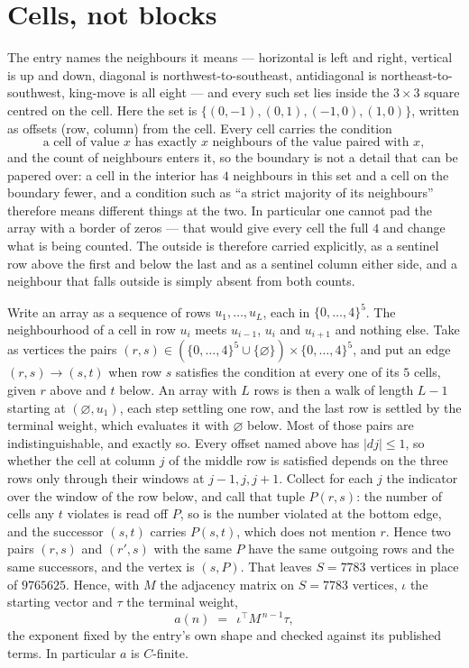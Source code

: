 \documentclass[11pt,a4paper]{article}
\theoremstyle{plain}
\theoremstyle{definition}
\begin{document}
\section{Cells, not blocks}

The entry names the neighbours it means --- horizontal is left and right, vertical is up and
down, diagonal is northwest-to-southeast, antidiagonal is northeast-to-southwest, king-move is
all eight --- and every such set lies inside the $3\times3$ square centred on the cell. Here
the set is $\{(0,-1), (0,1), (-1,0), (1,0)\}$, written as offsets (row, column) from the cell. Every cell carries
the condition
\[
\text{a cell of value }x\text{ has exactly }x\text{ neighbours of the value paired with }x,
\]
and the count of neighbours enters it, so the boundary is not a detail that can be papered
over: a cell in the interior has $4$ neighbours in this set and a cell on the boundary
fewer, and a condition such as ``a strict majority of its neighbours'' therefore means
different things at the two. In particular one cannot pad the array with a border of zeros ---
that would give every cell the full $4$ and change what is being counted. The outside is
therefore carried
explicitly, as a sentinel row above the first and below the last and as a sentinel column
either side, and a neighbour that falls outside is simply absent from both counts.

Write an array as a sequence of rows $u_1,\dots,u_L$, each in
$\{0,\dots,4\}^{5}$. The neighbourhood of a cell in row $u_i$ meets $u_{i-1}$,
$u_i$ and $u_{i+1}$ and nothing else. Take as vertices the pairs
$(r,s)\in(\{0,\dots,4\}^{5}\cup\{\varnothing\})\times\{0,\dots,4\}^{5}$,
and put an edge $(r,s)\to(s,t)$ when row $s$ satisfies the condition at every one of its
$5$ cells, given $r$ above and $t$ below. An array with $L$ rows is then a walk of length
$L-1$ starting at $(\varnothing,u_1)$, each step settling one row, and the last row is
settled by the terminal weight, which evaluates it with $\varnothing$ below. Most of those pairs are indistinguishable, and exactly so. Every offset named above has $|dj|\le 1$, so whether the cell at column $j$ of the middle row is satisfied depends on the three rows only through their windows at $j-1,j,j+1$. Collect for each $j$ the indicator over the window of the row below, and call that tuple $P(r,s)$: the number of cells any $t$ violates is read off $P$, so is the number violated at the bottom edge, and the successor $(s,t)$ carries $P(s,t)$, which does not mention $r$. Hence two pairs $(r,s)$ and $(r',s)$ with the same $P$ have the same outgoing rows and the same successors, and the vertex is $(s,P)$. That leaves $S=7783$ vertices in place of $9765625$. Hence,
with $M$ the adjacency matrix on $S=7783$ vertices, $\iota$ the starting vector and $\tau$ the
terminal weight,
\[
a(n)\;=\;\,\iota^{\!\top}M^{\,n-1}\tau ,
\]
the exponent fixed by the entry's own shape and checked against its published terms. In
particular $a$ is $C$-finite.
\end{document}
